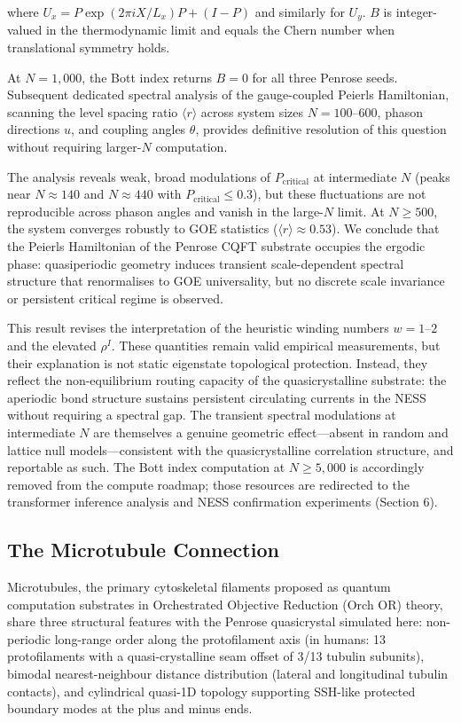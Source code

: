 \documentclass[11pt,a4paper]{article}
\begin{document}
where $U_x = P \exp(2\pi i X/L_x) P + (I-P)$ and similarly for $U_y$. $B$ is integer-valued in the thermodynamic limit and equals the Chern number when translational symmetry holds.

At $N = 1{,}000$, the Bott index returns $B = 0$ for all three Penrose seeds. Subsequent dedicated spectral analysis of the gauge-coupled Peierls Hamiltonian, scanning the level spacing ratio $\langle r\rangle$ across system sizes $N = 100$--$600$, phason directions $u$, and coupling angles $\theta$, provides definitive resolution of this question without requiring larger-$N$ computation.

The analysis reveals weak, broad modulations of $P_{\text{critical}}$ at intermediate $N$ (peaks near $N \approx 140$ and $N \approx 440$ with $P_{\text{critical}} \leq 0.3$), but these fluctuations are not reproducible across phason angles and vanish in the large-$N$ limit. At $N \geq 500$, the system converges robustly to GOE statistics ($\langle r\rangle \approx 0.53$). We conclude that the Peierls Hamiltonian of the Penrose CQFT substrate occupies the ergodic phase: quasiperiodic geometry induces transient scale-dependent spectral structure that renormalises to GOE universality, but no discrete scale invariance or persistent critical regime is observed.

This result revises the interpretation of the heuristic winding numbers $w = 1$--$2$ and the elevated $\rho^I$. These quantities remain valid empirical measurements, but their explanation is not static eigenstate topological protection. Instead, they reflect the non-equilibrium routing capacity of the quasicrystalline substrate: the aperiodic bond structure sustains persistent circulating currents in the NESS without requiring a spectral gap. The transient spectral modulations at intermediate $N$ are themselves a genuine geometric effect---absent in random and lattice null models---consistent with the quasicrystalline correlation structure, and reportable as such. The Bott index computation at $N \geq 5{,}000$ is accordingly removed from the compute roadmap; those resources are redirected to the transformer inference analysis and NESS confirmation experiments (Section 6).

\subsection{The Microtubule Connection}

Microtubules, the primary cytoskeletal filaments proposed as quantum computation substrates in Orchestrated Objective Reduction (Orch OR) theory, share three structural features with the Penrose quasicrystal simulated here: non-periodic long-range order along the protofilament axis (in humans: 13 protofilaments with a quasi-crystalline seam offset of 3/13 tubulin subunits), bimodal nearest-neighbour distance distribution (lateral and longitudinal tubulin contacts), and cylindrical quasi-1D topology supporting SSH-like protected boundary modes at the plus and minus ends.
\end{document}

